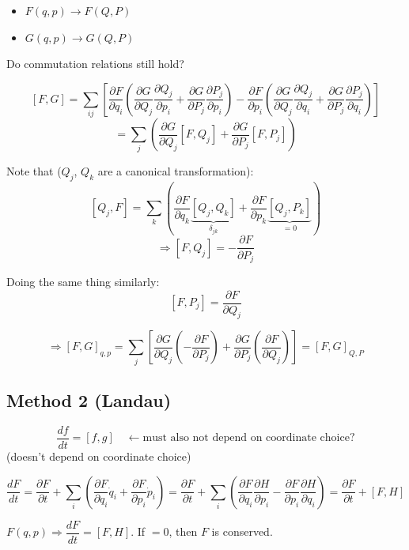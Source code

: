 \begin{itemize}
    \item $F(q,p) \to F(Q,P)$
    \item $G(q,p) \to G(Q,P)$
\end{itemize}
Do commutation relations still hold?

\[
    [F,G] = \sum_{ij}\!\left[\frac{\partial F}{\partial q_i}\!\left(\frac{\partial G}{\partial Q_j}\frac{\partial Q_j}{\partial p_i} + \frac{\partial G}{\partial P_j}\frac{\partial P_j}{\partial p_i}\right) - \frac{\partial F}{\partial p_i}\!\left(\frac{\partial G}{\partial Q_j}\frac{\partial Q_j}{\partial q_i} + \frac{\partial G}{\partial P_j}\frac{\partial P_j}{\partial q_i}\right)\right]
\]
\[
    = \sum_j\!\left(\frac{\partial G}{\partial Q_j}[F, Q_j] + \frac{\partial G}{\partial P_j}[F, P_j]\right)
\]

Note that ($Q_j$, $Q_k$ are a canonical transformation):
\[
    [Q_j, F] = \sum_k\!\left(\frac{\partial F}{\partial q_k}\underbrace{[Q_j, Q_k]}_{\delta_{jk}} + \frac{\partial F}{\partial p_k}\underbrace{[Q_j, P_k]}_{=0}\right)
\]
\[
    \Rightarrow [F, Q_j] = -\frac{\partial F}{\partial P_j}
\]

Doing the same thing similarly:
\[
    [F, P_j] = \frac{\partial F}{\partial Q_j}
\]

\[
    \Rightarrow [F, G]_{q,p} = \sum_j\!\left[\frac{\partial G}{\partial Q_j}\!\left(-\frac{\partial F}{\partial P_j}\right) + \frac{\partial G}{\partial P_j}\!\left(\frac{\partial F}{\partial Q_j}\right)\right] = [F,G]_{Q,P}
\]

\subsection*{Method 2 (Landau)}

\[
    \frac{df}{dt} = [f, g] \quad \leftarrow \text{must also not depend on coordinate choice?}
\]
(doesn't depend on coordinate choice)

\begin{theorem}
\[
    \frac{dF}{dt} = \frac{\partial F}{\partial t} + \sum_i\!\left(\frac{\partial F}{\partial q_i}\dot{q}_i + \frac{\partial F}{\partial p_i}\dot{p}_i\right)
    = \frac{\partial F}{\partial t} + \sum_i\!\left(\frac{\partial F}{\partial q_i}\frac{\partial H}{\partial p_i} - \frac{\partial F}{\partial p_i}\frac{\partial H}{\partial q_i}\right)
    = \frac{\partial F}{\partial t} + [F, H]
\]
\end{theorem}

\begin{fact}
$F(q,p) \Rightarrow \dfrac{dF}{dt} = [F,H]$. If $= 0$, then $F$ is conserved.
\end{fact}

